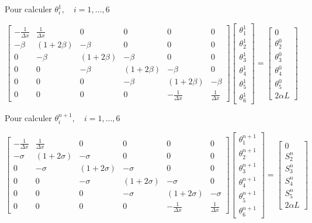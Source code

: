 \documentclass[10pt]{article}
\begin{document}
Pour calculer \(\theta_{i}^{1}, \quad i=1, \ldots, 6\)

\[
\left[\begin{array}{cccccc}
-\frac{1}{\Delta x} & \frac{1}{\Delta x} & 0 & 0 & 0 & 0 \\
-\beta & (1+2 \beta) & -\beta & 0 & 0 & 0 \\
0 & -\beta & (1+2 \beta) & -\beta & 0 & 0 \\
0 & 0 & -\beta & (1+2 \beta) & -\beta & 0 \\
0 & 0 & 0 & -\beta & (1+2 \beta) & -\beta \\
0 & 0 & 0 & 0 & -\frac{1}{\Delta x} & \frac{1}{\Delta x}
\end{array}\right]\left[\begin{array}{l}
\theta_{1}^{1} \\
\theta_{2}^{1} \\
\theta_{3}^{1} \\
\theta_{4}^{1} \\
\theta_{5}^{1} \\
\theta_{6}^{1}
\end{array}\right]=\left[\begin{array}{c}
0 \\
\theta_{2}^{0} \\
\theta_{3}^{0} \\
\theta_{4}^{0} \\
\theta_{5}^{0} \\
2 \alpha L
\end{array}\right]
\]

Pour calculer \(\theta_{i}^{n+1}, \quad i=1, \ldots, 6\)

\[
\left[\begin{array}{cccccc}
-\frac{1}{\Delta x} & \frac{1}{\Delta x} & 0 & 0 & 0 & 0 \\
-\sigma & (1+2 \sigma) & -\sigma & 0 & 0 & 0 \\
0 & -\sigma & (1+2 \sigma) & -\sigma & 0 & 0 \\
0 & 0 & -\sigma & (1+2 \sigma) & -\sigma & 0 \\
0 & 0 & 0 & -\sigma & (1+2 \sigma) & -\sigma \\
0 & 0 & 0 & 0 & -\frac{1}{\Delta x} & \frac{1}{\Delta x}
\end{array}\right]\left[\begin{array}{c}
\theta_{1}^{n+1} \\
\theta_{2}^{n+1} \\
\theta_{3}^{n+1} \\
\theta_{4}^{n+1} \\
\theta_{5}^{n+1} \\
\theta_{6}^{n+1}
\end{array}\right]=\left[\begin{array}{c}
0 \\
S_{2}^{n} \\
S_{3}^{n} \\
S_{4}^{n} \\
S_{5}^{n} \\
2 \alpha L
\end{array}\right]
\]
\end{document}
